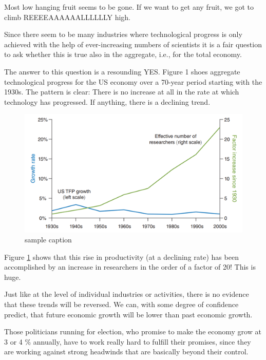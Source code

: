 \documentclass[
]{book}
\begin{document}
Most low hanging fruit seems to be gone. If we want to get any fruit, we got to climb REEEEAAAAAALLLLLLY high.

Since there seem to be many industries where technological progress is only achieved with the help of ever-increasing numbers of scientists it is a fair question to ask whether this is true also in the aggregate, i.e., for the total economy.

The answer to this question is a resounding YES. Figure 1 shoes aggregate technological progress for the US economy over a 70-year period starting with the 1930s. The pattern is clear: There is no increase at all in the rate at which technology has progressed. If anything, there is a declining trend.

\begin{figure}

{\centering \includegraphics[width=1\linewidth]{img/ch1/moore20} 

}

\caption{sample caption}\label{fig:fig120}
\end{figure}

Figure \ref{fig:fig120} shows that this rise in productivity (at a declining rate) has been accomplished by an increase in researchers in the order of a factor of 20! This is huge.

Just like at the level of individual industries or activities, there is no evidence that these trends will be reversed. We can, with some degree of confidence predict, that future economic growth will be lower than past economic growth.

Those politicians running for election, who promise to make the economy grow at 3 or 4 \% annually, have to work really hard to fulfill their promises, since they are working against strong headwinds that are basically beyond their control.
\end{document}
